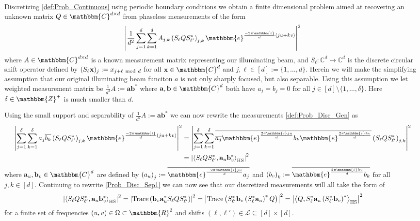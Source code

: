 \documentclass[]{spie}  %
\def \a {\mathbf a}
\def \b {\mathbf b}
\def \x {\mathbf x}
\def \e { \mathbbm{e}}
\def \i { \mathbbm{i}}
\begin{document}
Discretizing \eqref{def:Prob_Continuous} using periodic boundary conditions we obtain a finite dimensional problem aimed at recovering an unknown matrix $Q \in \mathbbm{C}^{d \times d}$ from phaseless measurements of the form
\begin{equation}
\left| \frac{1}{d^2} \sum^d_{j=1} \sum^d_{k=1} A_{j,k} \left(S_{\ell}QS^*_{\ell'}\right)_{j,k} \e^{\frac{-2\pi \i}{d}(ju + kv)} \right|^2
\label{def:Prob_Disc_Gen}
\end{equation}
where $A \in \mathbbm{C}^{d \times d}$ is a known measurement matrix representing our illuminating beam, and $S_\ell: \mathbb{C}^d \mapsto \mathbb{C}^d$ is the discrete circular shift operator defined by $(S_\ell \x)_j := x_{j+\ell ~{\rm mod}~ d}$ for all $\x \in \mathbbm{C}^d$ and $j,\ell \in [d] := \{ 1, \dots, d\}$.  Herein we will make the simplifying assumption that our original illuminating beam funciton $a$ is not only sharply focused, but also separable.  Using this assumption we let weighted measurement matrix be $\frac{1}{d^2} A := \a \b^*$ where $\a,\b \in \mathbbm{C}^d$ both have $a_j = b_j = 0$ for all $j \in [d] \setminus \{ 1, \dots, \delta \}$.  Here $\delta \in \mathbbm{Z}^+$ is much smaller than $d$.

Using the small support and separability of $\frac{1}{d^2} A := \a \b^*$ we can now rewrite the measurements \eqref{def:Prob_Disc_Gen} as
\begin{align}
\left| \sum^\delta_{j=1} \sum^\delta_{k=1} a_j \overline{b_k} \left(S_{\ell}QS^*_{\ell'}\right)_{j,k} \e^{\frac{-2\pi \i}{d}(ju + kv)} \right|^2 &= \left| \sum^\delta_{j=1} \sum^\delta_{k=1} \overline{\overline{a_j}\e^{\frac{2 \pi \i j u}{d}}  b_k \e^{\frac{2 \pi \i k v}{d}}} \left(S_{\ell}QS^*_{\ell'}\right)_{j,k} \right|^2 \nonumber \\
&= \left| \left\langle S_{\ell}QS^*_{\ell'}, \a_u \b^*_v \right\rangle_{\rm HS} \right|^2
\label{Prob_Disc_Sep1}
\end{align}
where $\a_u, \b_v \in \mathbbm{C}^d$ are defined by $\left( a_u \right)_j := \overline{\e^{\frac{-2 \pi \i j u}{d}} a_j}$ and $\left( b_v \right)_k := \overline{\e^{\frac{2 \pi \i k v}{d}} b_k}$ for all $j,k \in [d]$.  Continuing to rewrite \eqref{Prob_Disc_Sep1} we can now see that our discretized measurements will all take the form of 
\begin{equation}
\left| \left\langle S_{\ell}QS^*_{\ell'}, \a_u \b^*_v \right\rangle_{\rm HS} \right|^2 = \left| {\rm Trace}\left( \b_v \a^*_u S_{\ell}QS^*_{\ell'} \right) \right|^2 = \left| {\rm Trace}\left( S^*_{\ell'} \b_v  \left(S^*_{\ell} \a_u \right)^*Q \right) \right|^2 = \left| \left\langle Q, S^*_{\ell} \a_u \left(S^*_{\ell'} \b_v \right)^* \right\rangle_{\rm HS} \right|^2
\label{Prob_Disc}
\end{equation}
for a finite set of frequencies $(u,v) \in \Omega \subset \mathbbm{R}^2$ and shifts $(\ell,\ell') \in \mathcal{L} \subseteq [d] \times [d]$.
\end{document}
